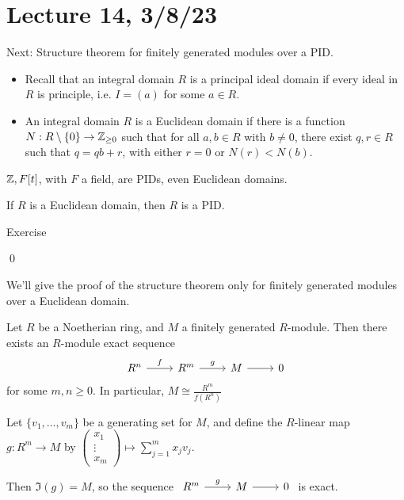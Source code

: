 \documentclass[x11names,reqno,14pt]{extarticle}
\begin{document}
\section*{Lecture 14, 3/8/23}

Next: Structure theorem for finitely generated modules over a PID. 

\begin{itemize}

\item Recall that an integral domain $R$ is a principal ideal domain if every ideal in $R$ is principle, i.e. $I = (a)$ for some $a \in R$.

\item An integral domain $R$ is a Euclidean domain if there is a function $N:R\setminus\{0\}\to\mathbb{Z}_{\geq0}$ such that for all $a, b \in R$ with $b \neq 0$, there exist $q, r \in R$ such that $q = qb + r$, with either $r = 0$ or $N(r) < N(b)$.

\end{itemize}

\exm

$\mathbb{Z}, F[t]$, with $F$ a field, are PIDs, even Euclidean domains. 

\lem

If $R$ is a Euclidean domain, then $R$ is a PID. 

\proof

Exercise

\qed

We'll give the proof of the structure theorem only for finitely generated modules over a Euclidean domain. 

\lem

Let $R$ be a Noetherian ring, and $M$ a finitely generated $R$-module. Then there exists an $R$-module exact sequence
\[
\begin{tikzcd}
R^n\ar[r, "f"] & R^m \ar[r, "g"] & M \ar[r] & 0
\end{tikzcd}
\]
for some $m, n \geq 0$. In particular, $M \cong \frac{R^m}{f(R^n)}$

\proof

Let $\{v_1, \dots, v_m\}$ be a generating set for $M$, and define the $R$-linear map $g:R^m\to M$ by $\begin{pmatrix} x_1 \\ \vdots \\ x_m \end{pmatrix} \mapsto \sum_{j=1}^mx_jv_j$. 

Then $\Im(g) = M$, so the sequence $\begin{tikzcd} R^m\ar[r, "g"] & M \ar[r] & 0 \end{tikzcd}$ is exact. 
\end{document}
